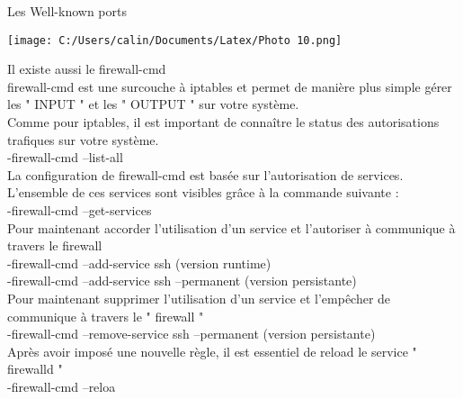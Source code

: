 \documentclass[11pt,a4peper]{article}
\begin{document}
Les Well-known ports

\texttt{[image: C:/Users/calin/Documents/Latex/Photo 10.png]} 

Il existe aussi le firewall-cmd\\
firewall-cmd est une surcouche à iptables et permet de manière plus simple gérer les " INPUT " et les " OUTPUT " sur votre système.\\
Comme pour iptables, il est important de connaître le status des autorisations trafiques sur votre système.\\
-firewall-cmd --list-all\\
La configuration de firewall-cmd est basée sur l’autorisation de services.\\
L’ensemble de ces services sont visibles grâce à la commande suivante :\\
-firewall-cmd --get-services\\

Pour maintenant accorder l’utilisation d’un service et l’autoriser à communique à travers le firewall\\
-firewall-cmd --add-service ssh (version runtime)\\
-firewall-cmd --add-service ssh --permanent (version persistante)\\
Pour maintenant supprimer l’utilisation d’un service et l’empêcher de communique à travers le " firewall "\\
-firewall-cmd --remove-service ssh --permanent (version persistante)\\
Après avoir imposé une nouvelle règle, il est essentiel de reload le service " firewalld "\\
-firewall-cmd –reloa
\end{document}

